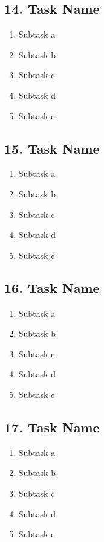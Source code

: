 \documentclass[12pt]{article}
\begin{document}
\subsection*{14. Task Name}
\begin{enumerate}[label=\alph*.]
    \item Subtask a
    \item Subtask b
    \item Subtask c
    \item Subtask d
    \item Subtask e
\end{enumerate}

\subsection*{15. Task Name}
\begin{enumerate}[label=\alph*.]
    \item Subtask a
    \item Subtask b
    \item Subtask c
    \item Subtask d
    \item Subtask e
\end{enumerate}

\subsection*{16. Task Name}
\begin{enumerate}[label=\alph*.]
    \item Subtask a
    \item Subtask b
    \item Subtask c
    \item Subtask d
    \item Subtask e
\end{enumerate}

\subsection*{17. Task Name}
\begin{enumerate}[label=\alph*.]
    \item Subtask a
    \item Subtask b
    \item Subtask c
    \item Subtask d
    \item Subtask e
\end{enumerate}
\end{document}
